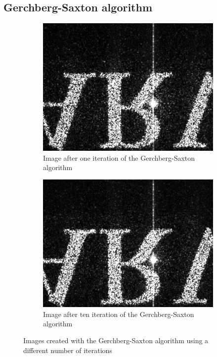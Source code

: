 \documentclass[a4paper,10pt]{article}
\begin{document}
\subsection{Gerchberg-Saxton algorithm}
\begin{figure}[H]
    \centering
    \begin{subfigure}[b]{0.49\textwidth}
        \includegraphics[width=\textwidth]{1iteration}
        \caption{Image after one iteration of the Gerchberg-Saxton algorithm}
    \end{subfigure}
    \hfill
    \begin{subfigure}[b]{0.49\textwidth}
        \includegraphics[width=\textwidth]{10iteration}
        \caption{Image after ten iteration of the Gerchberg-Saxton algorithm}
    \end{subfigure}
\caption{Images created with the Gerchberg-Saxton algorithm using a different number of iterations}\label{gsalgorithm}
\end{figure}
\end{document}

